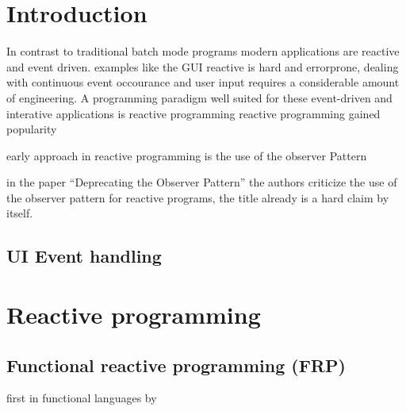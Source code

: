 \documentclass[acmtoc, authorversion]{acmart}
\begin{document}
%
%





\maketitle


\section{Introduction}

In contrast to traditional batch mode programs modern applications are reactive and event driven. 
examples like the GUI 
reactive is hard and errorprone, dealing with continuous event occourance and user input requires a considerable amount of engineering.
A programming paradigm well suited for these event-driven and interative applications is reactive programming
reactive programming gained popularity

early approach in reactive programming is the use of the observer Pattern

in the paper ``Deprecating the Observer Pattern'' the authors criticize the use of the observer pattern for reactive programs,
the title already is a hard claim by itself.



\subsection{UI Event handling}

\section{Reactive programming}

\subsection{Functional reactive programming (FRP)}

first in functional languages by~\cite{Elliott}
\end{document}
